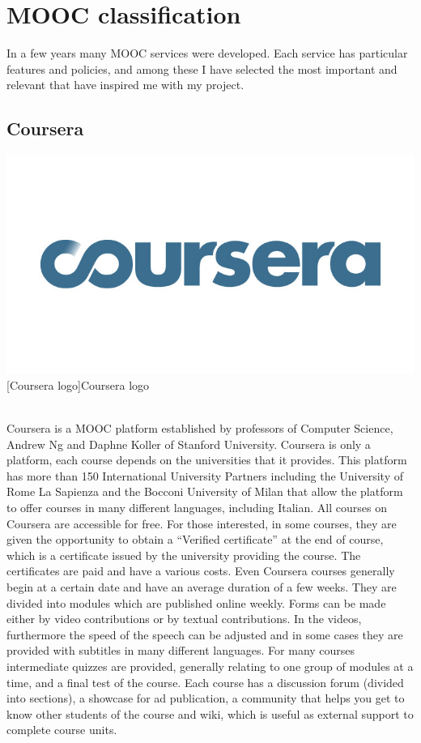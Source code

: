 \section{MOOC classification}
\label{sec:mooc_classification}

In a few years many MOOC services were developed. Each service has particular features and policies, and among these I have selected the most important and relevant that have inspired me with my project.

\subsection{Coursera}
\label{subsec:coursera}

  \begin{minipage}{\linewidth}
      \centering
      \includegraphics[width=0.5\linewidth]{images/chapter1/coursera.jpg}
      [Coursera logo]{Coursera logo}
  \end{minipage}
\\

Coursera is a MOOC platform established by professors of Computer Science, Andrew Ng and Daphne Koller of Stanford University. Coursera is only a platform, each course depends on the universities that it provides. This platform has more than 150 International University Partners including the University of Rome La Sapienza and the Bocconi University of Milan that allow the platform to offer courses in many different languages, including Italian. All courses on Coursera are accessible for free.
For those interested, in some courses, they are given the opportunity to obtain a “Verified certificate” at the end of course, which is a certificate issued by the university providing the course. The certificates are paid and have a various costs.
Even Coursera courses generally begin at a certain date and have an average duration of a few weeks. They are divided into modules which are published online weekly. Forms can be made either by video contributions or by textual contributions. In the videos, furthermore the speed of the speech can be adjusted and in some cases they are provided with subtitles in many different languages.
For many courses intermediate quizzes are provided, generally relating to one group of modules at a time, and a final test of the course.
Each course has a discussion forum (divided into sections), a showcase for ad publication, a community that helps you get to know other students of the course and wiki, which is useful as external support to complete course units.

